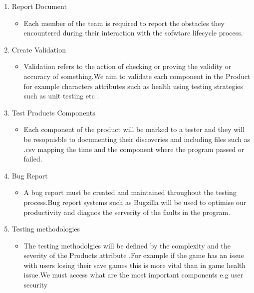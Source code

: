 \begin{enumerate}
   \item Report Document
   \begin{itemize}
     \item  Each member of the team is required to report the obstacles they encountered during their interaction with the sofwtare lifecycle process.
   \end{itemize}
  
  \item Create Validation
   \begin{itemize}
     \item Validation refers to the action of checking or proving the validity or accuracy of something.We aim to validate each component in the Product for example characters attributes such as health using testing strategies  such as unit testing etc .
   \end{itemize}

     \item Test Products Components
   \begin{itemize}
     \item Each component of the product will be marked to a tester and they will be resopnisble to documenting their discoveries and including files such as .csv mapping the time and the component where the program passed or failed.
   \end{itemize}


   \item  Bug  Report
   \begin{itemize}
     \item A bug report must be created and maintained throughout the testing process.Bug report systems such as Bugzilla will be used to optimise our productivity and diagnos the serverity of the faults in the program.
   \end{itemize}

 

  \item Testing methodologies
   \begin{itemize}
     \item The testing methodolgies will be defined by the complexity and the severity of the Products attribute .For example if the game has an issue with users losing their save games this is more vital than in game health issue.We must access what are the most important components e.g user security
   \end{itemize}
\end{enumerate}
